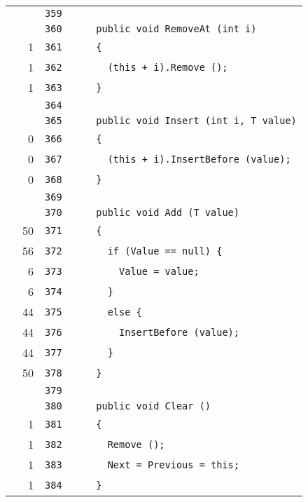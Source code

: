 \documentclass[a4paper,10pt]{article}
\begin{document}
\begin{longtable}[l]{lrrl}
\cellcolor{gray} &  & \verb~359~ & \verb~~\\
\cellcolor{gray} &  & \verb~360~ & \verb~    public void RemoveAt (int i)~\\
\cellcolor{green} & 1 & \verb~361~ & \verb~    {~\\
\cellcolor{green} & 1 & \verb~362~ & \verb~      (this + i).Remove ();~\\
\cellcolor{green} & 1 & \verb~363~ & \verb~    }~\\
\cellcolor{gray} &  & \verb~364~ & \verb~~\\
\cellcolor{gray} &  & \verb~365~ & \verb~    public void Insert (int i, T value)~\\
\cellcolor{red} & 0 & \verb~366~ & \verb~    {~\\
\cellcolor{red} & 0 & \verb~367~ & \verb~      (this + i).InsertBefore (value);~\\
\cellcolor{red} & 0 & \verb~368~ & \verb~    }~\\
\cellcolor{gray} &  & \verb~369~ & \verb~~\\
\cellcolor{gray} &  & \verb~370~ & \verb~    public void Add (T value)~\\
\cellcolor{green} & 50 & \verb~371~ & \verb~    {~\\
\cellcolor{green} & 56 & \verb~372~ & \verb~      if (Value == null) {~\\
\cellcolor{green} & 6 & \verb~373~ & \verb~        Value = value;~\\
\cellcolor{green} & 6 & \verb~374~ & \verb~      }~\\
\cellcolor{green} & 44 & \verb~375~ & \verb~      else {~\\
\cellcolor{green} & 44 & \verb~376~ & \verb~        InsertBefore (value);~\\
\cellcolor{green} & 44 & \verb~377~ & \verb~      }~\\
\cellcolor{green} & 50 & \verb~378~ & \verb~    }~\\
\cellcolor{gray} &  & \verb~379~ & \verb~~\\
\cellcolor{gray} &  & \verb~380~ & \verb~    public void Clear ()~\\
\cellcolor{green} & 1 & \verb~381~ & \verb~    {~\\
\cellcolor{green} & 1 & \verb~382~ & \verb~      Remove ();~\\
\cellcolor{green} & 1 & \verb~383~ & \verb~      Next = Previous = this;~\\
\cellcolor{green} & 1 & \verb~384~ & \verb~    }~\\

\end{longtable}
\end{document}
